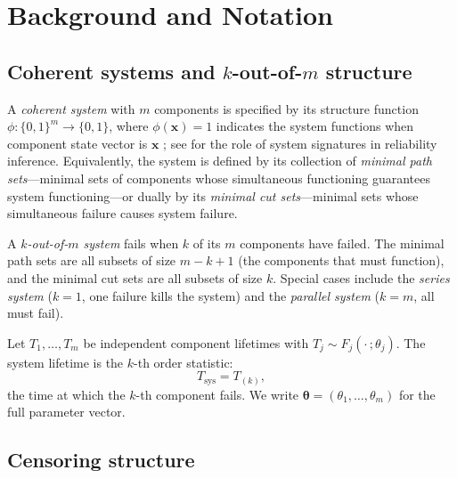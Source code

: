 \documentclass[12pt]{article}
\newcommand{\Tsys}{T_{\mathrm{sys}}}
\newcommand{\btheta}{\boldsymbol{\theta}}
\newcommand{\bx}{\mathbf{x}}
\begin{document}

\section{Background and Notation}\label{sec:background}

\subsection{Coherent systems and \texorpdfstring{$k$-out-of-$m$}{k-out-of-m} structure}
\label{sec:coherent}

A \emph{coherent system} with $m$ components is specified by its structure
function $\phi: \{0,1\}^m \to \{0,1\}$, where $\phi(\bx) = 1$ indicates
the system functions when component state vector is $\bx$
\citep{BarlowProschan1975}; see \citet{Samaniego2007} for the role of
system signatures in reliability inference.  Equivalently, the system is defined by its
collection of \emph{minimal path sets}---minimal sets of components whose
simultaneous functioning guarantees system functioning---or dually by its
\emph{minimal cut sets}---minimal sets whose simultaneous failure causes
system failure.

A \emph{$k$-out-of-$m$ system} fails when $k$ of its $m$ components
have failed.  The minimal path sets are all subsets of size $m - k + 1$
(the components that must function), and the minimal cut sets are all
subsets of size $k$.  Special cases include the \emph{series system}
($k = 1$, one failure kills the system) and the \emph{parallel system}
($k = m$, all must fail).

Let $T_1, \ldots, T_m$ be independent component lifetimes with
$T_j \sim F_j(\cdot\,; \theta_j)$.  The system lifetime is the $k$-th
order statistic:
\begin{equation}\label{eq:tsys}
  \Tsys = T_{(k)},
\end{equation}
the time at which the $k$-th component fails.  We write $\btheta = (\theta_1,
\ldots, \theta_m)$ for the full parameter vector.

\subsection{Censoring structure}\label{sec:censoring}
\end{document}
